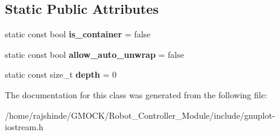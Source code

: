 \subsection*{Static Public Attributes}
\begin{DoxyCompactItemize}
\item 
static const bool {\bfseries is\+\_\+container} = false\hypertarget{classgnuplotio_1_1_array_traits_ac5d19b25086565613c305960bd9d4a78}{}\label{classgnuplotio_1_1_array_traits_ac5d19b25086565613c305960bd9d4a78}

\item 
static const bool {\bfseries allow\+\_\+auto\+\_\+unwrap} = false\hypertarget{classgnuplotio_1_1_array_traits_a354d64663551a34c36c5fa7823859668}{}\label{classgnuplotio_1_1_array_traits_a354d64663551a34c36c5fa7823859668}

\item 
static const size\+\_\+t {\bfseries depth} = 0\hypertarget{classgnuplotio_1_1_array_traits_a6fbd8c815e595f4efbcafd9b0eeb06f2}{}\label{classgnuplotio_1_1_array_traits_a6fbd8c815e595f4efbcafd9b0eeb06f2}

\end{DoxyCompactItemize}


The documentation for this class was generated from the following file\+:\begin{DoxyCompactItemize}
\item 
/home/rajshinde/\+G\+M\+O\+C\+K/\+Robot\+\_\+\+Controller\+\_\+\+Module/include/gnuplot-\/iostream.\+h\end{DoxyCompactItemize}
